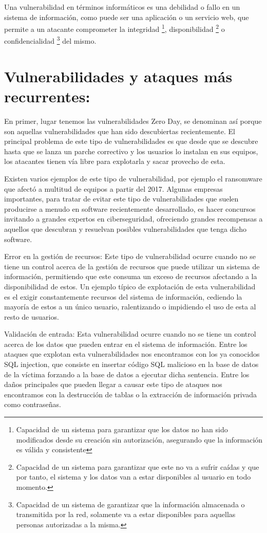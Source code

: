 Una vulnerabilidad en términos informáticos es una debilidad o fallo en un sistema de información, como puede ser una aplicación o un servicio web, que permite a un atacante comprometer la integridad \footnote{Capacidad de un sistema para garantizar que los datos no han sido modificados desde su creación sin autorización, asegurando que la información es válida y consistente}, disponibilidad \footnote{Capacidad de un sistema para garantizar que este no va a sufrir caídas y que por tanto, el sistema y los datos van a estar disponibles al usuario en todo momento.} o confidencialidad \footnote{Capacidad de un sistema de garantizar que la información almacenada o transmitida por la red, solamente va a estar disponibles para aquellas personas autorizadas a la misma.} del mismo.

\section{Vulnerabilidades y ataques más recurrentes:}

En primer, lugar tenemos las vulnerabilidades Zero Day, se denominan así porque son aquellas 
vulnerabilidades que han sido descubiertas recientemente. El principal problema de este tipo de 
vulnerabilidades es que desde que se descubre hasta que se lanza un parche correctivo y los 
usuarios lo instalan en sus equipos, los atacantes tienen vía libre para explotarla y sacar provecho 
de esta. 

Existen varios ejemplos de este tipo de vulnerabilidad, por ejemplo el ransomware que afectó a 
multitud de equipos a partir del 2017. Algunas empresas importantes, para tratar de evitar este 
tipo de vulnerabilidades que suelen producirse a menudo en software recientemente desarrollado, 
es hacer concursos invitando a grandes  expertos en ciberseguridad, ofreciendo grandes recompensas 
a aquellos que descubran y resuelvan posibles vulnerabilidades que tenga dicho software.

Error en la gestión de recursos:
Este tipo de vulnerabilidad ocurre cuando no se tiene un control acerca de la gestión de recursos que puede utilizar un sistema de información, permitiendo que este consuma un exceso de recursos afectando a la disponibilidad de estos.
Un ejemplo típico de explotación de esta vulnerabilidad es el exigir constantemente recursos del sistema de información, cediendo la mayoría de estos a un único usuario, ralentizando o impidiendo el uso de esta al resto de usuarios.

Validación de entrada:
Esta vulnerabilidad ocurre cuando no se tiene un control acerca de los datos que pueden entrar en el sistema de información.
Entre los ataques que explotan esta vulnerabilidades nos encontramos con los ya conocidos SQL injection, que consiste en insertar código SQL malicioso en la base de datos de la víctima forzando a la base de datos a ejecutar dicha sentencia.
Entre los daños principales que pueden llegar a causar este tipo de ataques nos encontramos con la destrucción de tablas o la extracción de información privada como contraseñas.

